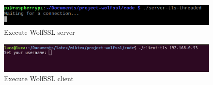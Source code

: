 \documentclass[a4paper,12pt]{report}
\begin{document}
\begin{figure}[H]
    \centering
    \includegraphics[scale=0.65]{./code/img/1-server.png}
    \caption{Execute WolfSSL server}
    
\end{figure}

\begin{figure}[H]
    \centering
    \includegraphics[scale=0.248]{./code/img/1-client.png}
    \caption{Execute WolfSSL client}
    
\end{figure}
\end{document}
